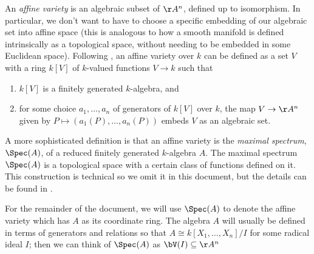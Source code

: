 \documentclass[12pt]{amsart}
\theoremstyle{plain}
\begin{document}
An \emph{affine variety} is an algebraic subset of $\AA^n$, defined up to isomorphism.
In particular, we don't want to have to choose a specific embedding of our algebraic set into affine space 
(this is analogous to how a smooth manifold is defined intrinsically as a topological space, without needing to be embedded in some Euclidean space).
Following \cite[\S 4.6]{Reid88}, an affine variety over $k$ can be defined as a set $V$ with a ring $k[V]$ of $k$-valued functions $V \to k$ such that
\begin{enumerate}
\item $k[V]$ is a finitely generated $k$-algebra, and
\item for some choice $a_1, \ldots, a_n$ of generators of $k[V]$ over $k$, the map $V \to \AA^n$ given by $P \mapsto (a_1(P), \ldots, a_n(P))$ embeds $V$ as an algebraic set.
\end{enumerate}
A more sophisticated definition is that an affine variety is the \emph{maximal spectrum}, $\Spec(A)$, of a reduced finitely generated $k$-algebra $A$.
The maximal spectrum $\Spec(A)$ is a topological space with a certain class of functions defined on it.
This construction is technical so we omit it in this document, but the details can be found in \cite[Chapter 3]{Milne13}.

For the remainder of the document, we will use $\Spec(A)$ to denote the affine variety which has $A$ as its coordinate ring.
The algebra $A$ will usually be defined in terms of generators and relations so that $A \cong k[X_1, \ldots, X_n] / I$ for some radical ideal $I$; 
then we can think of $\Spec(A)$ as $\bV(I) \subseteq \AA^n$
\end{document}
